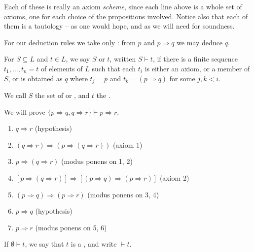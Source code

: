 Each of these is really an axiom \emph{scheme}, since each line above is a whole set of axioms, one for each choice of the propositions involved. Notice also that each of them is a tautology -- as one would hope, and as we will need for soundness.

For our deduction rules we take only : from $p$ and $p \Rightarrow q$ we may deduce $q$.

\begin{definition}
  For $S \subseteq L$ and $t \in L$, we say $S$  or  $t$, written $S \vdash t$, if there is a finite sequence $t_1, \dots, t_n = t$ of elements of $L$ such that each $t_i$ is either an axiom, or a member of $S$, or is obtained as $q$ where $t_j = p$ and $t_k = (p \Rightarrow q)$ for some $j, k < i$.

  We call $S$ the set of  or , and $t$ the .
\end{definition}

\begin{example}
  We will prove $\{p\Rightarrow q, q \Rightarrow r\} \vdash p \Rightarrow r$.
  \begin{enumerate}
    \item $q \Rightarrow r$ \hfill (hypothesis)
    \item $(q \Rightarrow r) \Rightarrow(p \Rightarrow(q \Rightarrow r))$ \hfill (axiom 1)
    \item $p \Rightarrow(q \Rightarrow r)$ \hfill (modus ponens on 1, 2)
    \item $[p \Rightarrow(q \Rightarrow r)] \Rightarrow[(p \Rightarrow q) \Rightarrow(p \Rightarrow r)]$ \hfill (axiom 2)
    \item $(p \Rightarrow q) \Rightarrow(p \Rightarrow r)$ \hfill (modus ponens on 3, 4)
    \item $p \Rightarrow q$ \hfill (hypothesis)
    \item $p \Rightarrow r$ \hfill (modus ponens on 5, 6)
  \end{enumerate}
\end{example}

\begin{definition}[Theorem]
  If $\emptyset \vdash t$, we say that $t$ is a , and write $\vdash t$.
\end{definition}

